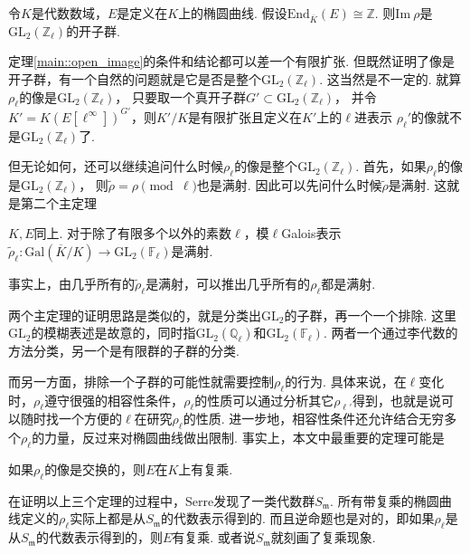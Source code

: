 \begin{cthm}
    令$K$是代数数域，$E$是定义在$K$上的椭圆曲线. 假设$\mathrm{End}_{\overline{K}}(E) \cong \mathbb{Z}$. 则$\mathrm{Im}\ \rho$是$\mathrm{GL}_2(\mathbb{Z}_{\ell})$的开子群. \label{main::open_image}
\end{cthm}

定理\ref{main::open_image}的条件和结论都可以差一个有限扩张.
但既然证明了像是开子群，有一个自然的问题就是它是否是整个$\mathrm{GL}_2(\mathbb{Z}_{\ell})$.
这当然是不一定的. 就算$\rho_{\ell}$的像是$\mathrm{GL}_2(\mathbb{Z}_{\ell})$，
只要取一个真开子群$G'\subset \mathrm{GL}_2(\mathbb{Z}_{\ell})$，
并令$K' = K(E[\ell^{\infty}])^{G'}$，则$K'/K$是有限扩张且定义在$K'$上的$\ell$进表示
$\rho_{\ell}'$的像就不是$\mathrm{GL}_2(\mathbb{Z}_{\ell})$了.

但无论如何，还可以继续追问什么时候$\rho_{\ell}$的像是整个$\mathrm{GL}_2(\mathbb{Z}_{\ell})$.
首先，如果$\rho_{\ell}$的像是$\mathrm{GL}_2(\mathbb{Z}_{\ell})$，
则$\tilde{\rho} = \rho \pmod{\ell}$也是满射.
因此可以先问什么时候$\tilde{\rho}$是满射. 这就是第二个主定理

\begin{cthm}
    $K, E$同上. 对于除了有限多个以外的素数$\ell$，模$\ell$Galois表示$\tilde{\rho}_{\ell}: \mathrm{Gal}(\overline{K}/K)\to \mathrm{GL}_2(\mathbb{F}_{\ell})$是满射. \label{main::surjective}
\end{cthm}

事实上，由几乎所有的$\tilde{\rho}_{\ell}$是满射，可以推出几乎所有的$\rho_{\ell}$都是满射.

两个主定理的证明思路是类似的，就是分类出$\mathrm{GL}_2$的子群，再一个一个排除. 这里$\mathrm{GL}_2$的模糊表述是故意的，同时指$\mathrm{GL}_2(\mathbb{Q}_{\ell})$和$\mathrm{GL}_2(\mathbb{F}_{\ell})$. 两者一个通过李代数的方法分类，另一个是有限群的子群的分类.

而另一方面，排除一个子群的可能性就需要控制$\rho_{\ell}$的行为. 具体来说，在$\ell$变化时，$\rho_{\ell}$遵守很强的相容性条件，$\rho_{\ell}$的性质可以通过分析其它$\rho_{\ell'}$得到，也就是说可以随时找一个方便的$\ell$在研究$\rho_{\ell}$的性质. 进一步地，相容性条件还允许结合无穷多个$\rho_{\ell}$的力量，反过来对椭圆曲线做出限制. 事实上，本文中最重要的定理可能是

\begin{cthm}
    如果$\rho_{\ell}$的像是交换的，则$E$在$K$上有复乘.
\end{cthm}

在证明以上三个定理的过程中，Serre发现了一类代数群$S_{\mathfrak{m}}$. 所有带复乘的椭圆曲线定义的$\rho_{\ell}$实际上都是从$S_{\mathfrak{m}}$的代数表示得到的. 而且逆命题也是对的，即如果$\rho_{\ell}$是从$S_{\mathfrak{m}}$的代数表示得到的，则$E$有复乘. 或者说$S_{\mathfrak{m}}$就刻画了复乘现象.

